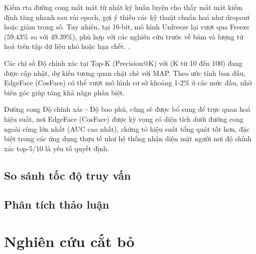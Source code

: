 Kiểm rta đường cong mất mát từ nhật ký huấn luyện cho thấy mất mát kiểm định tăng nhanh sau vài epoch, gợi ý thiếu các kỹ thuật chuẩn hoá như dropout hoặc giảm trọng số. Tuy nhiên, tại 16-bit, mô hình Unfreeze lại vượt qua Freeze (59.43\% so với 49.39\%), phù hợp với các nghiên cứu trước về băm và lượng tử hoá trên tập dữ liệu nhỏ hoặc hạn chết. \cite{opqn}.

Các chỉ số Độ chính xác tại Top-K (Precision@K) với (K từ 10 đến 100) đang được cập nhật, dự kiến tương quan chặt chẽ với MAP. Theo ước tính ban đầu, EdgeFace (CosFace) có thể vượt mô hình cơ sở khoảng 1-2\% ở các mức đầu, nhờ biên góc giúp tăng khả năgn phân biệt.

Đường cong Độ chính xác - Độ bao phủ, cũng sẽ được bổ sung để trực quan hoá hiệu suất, nơi EdgeFace (CosFace) được kỳ vọng có diện tích dưới đường cong ngoài cùng lớn nhất (AUC cao nhất), chứng tỏ hiệu suất tổng quát tốt hơn, đặc biệt trong các ứng dụng thựu tế như hệ thống nhận diện mặt người nơi độ chính xác top-5/10 là yếu tố quyết định.

\subsection{So sánh tốc độ truy vấn}

\subsection{Phân tích thảo luận}


\section {Nghiên cứu cắt bỏ}